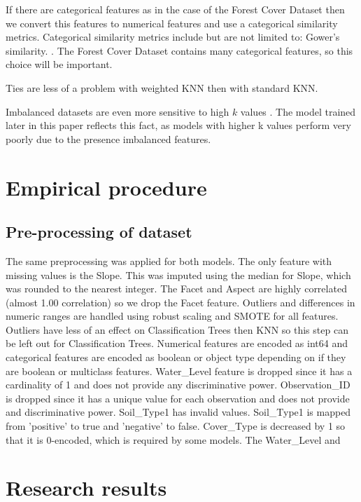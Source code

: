\documentclass[conference]{IEEEtran}
\begin{document}
If there are categorical features as in the case of the Forest Cover Dataset then we convert this features to numerical features and use a categorical similarity metrics. Categorical similarity metrics include but are not limited to: Gower's similarity. \cite[p.~14-15]{similarity}. The Forest Cover Dataset contains many categorical features, so this choice will be important.

Ties are less of a problem with weighted KNN then with standard KNN.

Imbalanced datasets are even more sensitive to high $k$ values \cite[p.~193]{fundamentals}. The model trained later in this paper reflects this fact, as models with higher k values perform very poorly due to the presence imbalanced features.

\section{Empirical procedure}

\subsection{Pre-processing of dataset}

The same preprocessing was applied for both models. The only feature with missing values is the Slope. This was imputed using the median for Slope, which was rounded to the nearest integer. The Facet and Aspect are highly correlated (almost 1.00 correlation) so we drop the Facet feature. Outliers and differences in numeric ranges are handled using robust scaling and SMOTE for all features. Outliers have less of an effect on Classification Trees then KNN so this step can be left out for Classification Trees. Numerical features are encoded as int64 and categorical features are encoded as boolean or object type depending on if they are boolean or multiclass features. Water\_Level feature is dropped since it has a cardinality of 1 and does not provide any discriminative power. Observation\_ID is dropped since it has a unique value for each observation and does not provide and discriminative power. Soil\_Type1 has invalid values. Soil\_Type1 is mapped from 'positive' to true and 'negative' to false. Cover\_Type is decreased by 1 so that it is 0-encoded, which is required by some models. The Water\_Level and 

\section{Research results}
\end{document}
